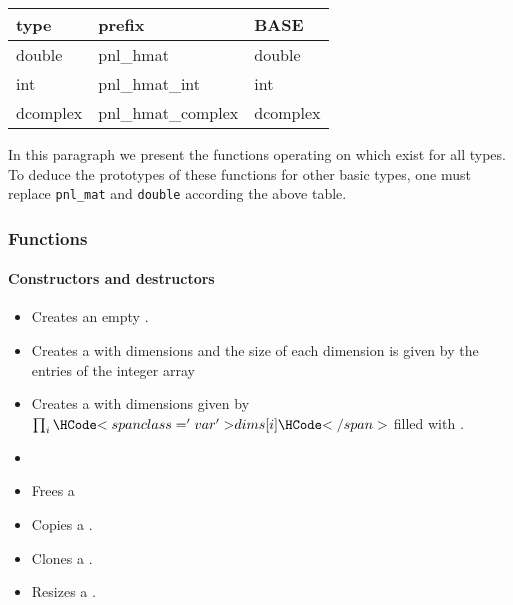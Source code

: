 \begin{center}
  \begin{tabular}[t]{lll}
    type & prefix & BASE\\
    \hline
    double & pnl_hmat & double \\
    \hline
    int & pnl_hmat_int & int \\
    \hline
    dcomplex & pnl_hmat_complex & dcomplex
  \end{tabular}
\end{center}

In this paragraph we present the functions operating on 
which exist for all types. To deduce the prototypes of these functions for
other basic types, one must replace {\tt pnl_mat} and {\tt double} according
the above table.


\subsubsection{Functions}

\paragraph{Constructors and destructors}
\begin{itemize}
  \item {}
    \sshortdescribe Creates an empty .

\item {}
  \sshortdescribe Creates a  with  dimensions and
  the size of each dimension is given by the entries of the integer array
  
\item 
  \sshortdescribe Creates a  with  dimensions given
  by $\prod_i \var{dims[i]}$ filled with .
  
\item 
  
\item {}
  \sshortdescribe Frees a 
  
\item {}
  \sshortdescribe Copies a .
  
\item {}
  \sshortdescribe Clones a .
  
\item {}
  \sshortdescribe Resizes a .
\end{itemize}  

